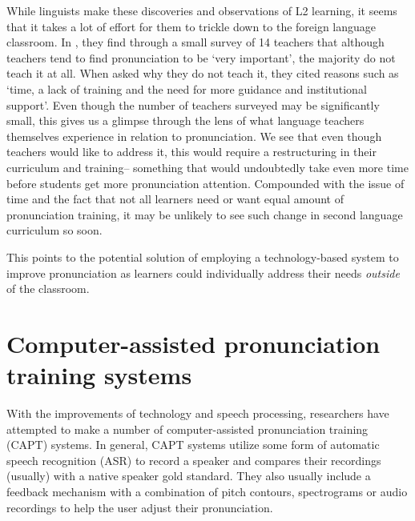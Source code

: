 \documentclass
[
    a4paper,
    twoside,
    12pt
]
{report}
\begin{document}
While linguists make these discoveries and observations of L2 learning,
it seems that it takes a lot of effort for them to trickle down to the
foreign language classroom. In \textcite{darcy2012}, they find through a
small survey of 14 teachers that although teachers tend to find
pronunciation to be `very important', the majority do not teach it at
all. When asked why they do not teach it, they cited reasons such as
`time, a lack of training and the need for more guidance and
institutional support'. Even though the number of teachers surveyed may
be significantly small, this gives us a glimpse through the lens of what
language teachers themselves experience in relation to pronunciation. We
see that even though teachers would like to address it, this would
require a restructuring in their curriculum and training-- something
that would undoubtedly take even more time before students get more
pronunciation attention. Compounded with the issue of time and the fact
that not all learners need or want equal amount of pronunciation
training, it may be unlikely to see such change in second language
curriculum so soon.

This points to the potential solution of employing a technology-based
system to improve pronunciation as learners could individually address
their needs \textit{outside} of the classroom.

\section{Computer-assisted pronunciation training
systems}\label{computer-assisted-pronunciation-training-systems}

\label{sec:capt} With the improvements of technology and speech
processing, researchers have attempted to make a number of
computer-assisted pronunciation training (CAPT) systems. In general,
CAPT systems utilize some form of automatic speech recognition (ASR) to
record a speaker and compares their recordings (usually) with a native
speaker gold standard. They also usually include a feedback mechanism
with a combination of pitch contours, spectrograms or audio recordings
to help the user adjust their pronunciation.
\end{document}
